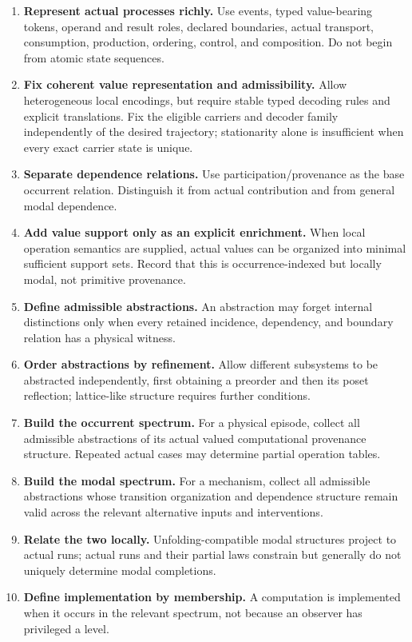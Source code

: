 \documentclass[11pt,a4paper]{article}
\begin{document}
\begin{enumerate}
  \item \textbf{Represent actual processes richly.} Use events, typed value-bearing tokens, operand and result roles, declared boundaries, actual transport, consumption, production, ordering, control, and composition. Do not begin from atomic state sequences.
  \item \textbf{Fix coherent value representation and admissibility.} Allow heterogeneous local encodings, but require stable typed decoding rules and explicit translations. Fix the eligible carriers and decoder family independently of the desired trajectory; stationarity alone is insufficient when every exact carrier state is unique.
  \item \textbf{Separate dependence relations.} Use participation/provenance as the base occurrent relation. Distinguish it from actual contribution and from general modal dependence.
  \item \textbf{Add value support only as an explicit enrichment.} When local operation semantics are supplied, actual values can be organized into minimal sufficient support sets. Record that this is occurrence-indexed but locally modal, not primitive provenance.
  \item \textbf{Define admissible abstractions.} An abstraction may forget internal distinctions only when every retained incidence, dependency, and boundary relation has a physical witness.
  \item \textbf{Order abstractions by refinement.} Allow different subsystems to be abstracted independently, first obtaining a preorder and then its poset reflection; lattice-like structure requires further conditions.
  \item \textbf{Build the occurrent spectrum.} For a physical episode, collect all admissible abstractions of its actual valued computational provenance structure. Repeated actual cases may determine partial operation tables.
  \item \textbf{Build the modal spectrum.} For a mechanism, collect all admissible abstractions whose transition organization and dependence structure remain valid across the relevant alternative inputs and interventions.
  \item \textbf{Relate the two locally.} Unfolding-compatible modal structures project to actual runs; actual runs and their partial laws constrain but generally do not uniquely determine modal completions.
  \item \textbf{Define implementation by membership.} A computation is implemented when it occurs in the relevant spectrum, not because an observer has privileged a level.

\end{enumerate}
\end{document}
